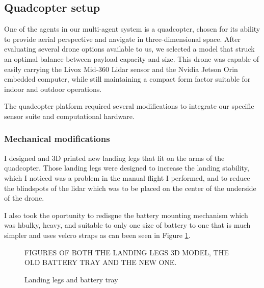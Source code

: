\documentclass[11pt]{article}
\begin{document}

        \subsection{Quadcopter setup}
                

                One of the agents in our multi-agent system is a quadcopter, chosen for its ability to provide aerial perspective and navigate in three-dimensional space. After evaluating several drone options available to us, we selected a model that struck an optimal balance between payload capacity and size. This drone was capable of easily carrying the Livox Mid-360 Lidar sensor and the Nvidia Jetson Orin embedded computer, while still maintaining a compact form factor suitable for indoor and outdoor operations.

                The quadcopter platform required several modifications to integrate our specific sensor suite and computational hardware.

                \subsubsection{Mechanical modifications}

                    I designed and 3D printed new landing legs that fit on the arms of the quadcopter. Those landing legs were designed to increase the landing stability, which I noticed was a problem in the manual flight I performed, and to reduce the blindspots of the lidar which was to be placed on the center of the underside of the drone.

                    I also took the oportunity to redisgne the battery mounting mechanism which was hbulky, heavy, and suitable to only one size of battery to one that is much simpler and uses velcro straps as can been seen in Figure \ref{fig:landing_legs}.
                    

                    \begin{figure}[H]
                        \centering
                        FIGURES OF BOTH THE LANDING LEGS 3D MODEL, THE OLD BATTERY TRAY AND THE NEW ONE.
                        \caption{Landing legs and battery tray}
                        \label{fig:landing_legs}
                    \end{figure}    
\end{document}
